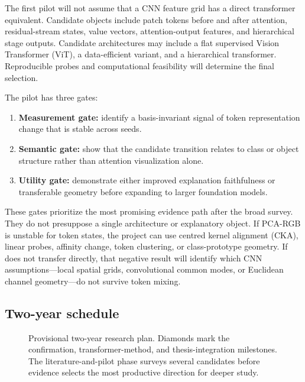 The first pilot will not assume that a CNN feature grid has a direct
transformer equivalent. Candidate objects include patch tokens before and after
attention, residual-stream states, value vectors, attention-output features,
and hierarchical stage outputs. Candidate architectures may include a flat
supervised Vision Transformer (ViT), a data-efficient variant, and a
hierarchical transformer. Reproducible probes and computational feasibility
will determine the final selection.

The pilot has three gates:

\begin{enumerate}[leftmargin=*]
    \item \textbf{Measurement gate:} identify a basis-invariant signal of
    token representation change that is stable across seeds.
    \item \textbf{Semantic gate:} show that the candidate transition relates
    to class or object structure rather than attention visualization alone.
    \item \textbf{Utility gate:} demonstrate either improved explanation
    faithfulness or transferable geometry before expanding to larger foundation
    models.
\end{enumerate}

These gates prioritize the most promising evidence path after the broad survey.
They do not presuppose a single architecture or explanatory object. If PCA-RGB
is unstable for token states, the project can use centred kernel alignment
(CKA), linear probes, affinity change, token clustering, or class-prototype
geometry. If \methodname{} does not transfer directly, that negative result
will identify which CNN assumptions---local spatial grids, convolutional common
modes, or Euclidean channel geometry---do not survive token mixing.

\subsection{Two-year schedule}

\begin{figure}[H]
\centering
\resizebox{\linewidth}{!}{}
\caption{Provisional two-year research plan. Diamonds mark the confirmation,
transformer-method, and thesis-integration milestones. The literature-and-pilot
phase surveys several candidates before evidence selects the most productive
direction for deeper study.}
\label{fig:gantt}
\end{figure}

